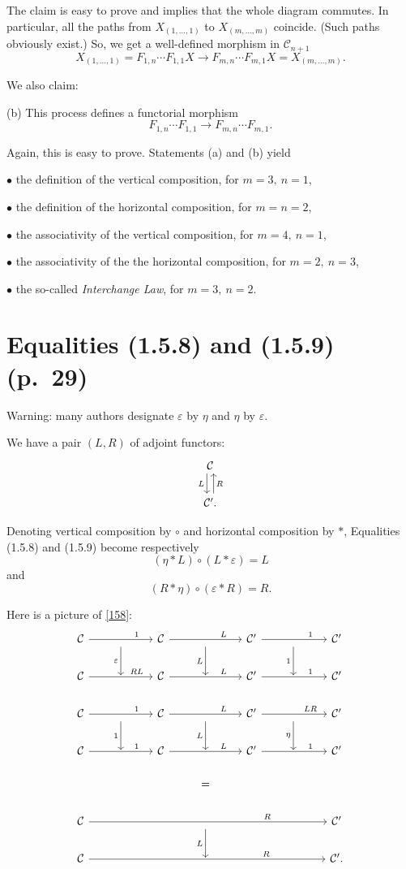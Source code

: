 \documentclass[12pt]{article}
\theoremstyle{remark}%
\newcommand{\bu}{\bullet}
\newcommand{\n}{\noindent}
\newcommand{\C}{\mathcal C}
\newcommand{\e}{\varepsilon}
\newcommand{\be}{\begin{equation}}
\newcommand{\ee}{\end{equation}}
\begin{document}
The claim is easy to prove and implies that the whole diagram commutes. In particular, all the paths from $X_{(1,\dots,1)}$ to $X_{(m,\dots,m)}$ coincide. (Such paths obviously exist.) So, we get a well-defined morphism in $\C_{n+1}$
$$
X_{(1,\dots,1)}=F_{1,n}\cdots F_{1,1}X\to F_{m,n}\cdots F_{m,1}X=X_{(m,\dots,m)}.
$$

We also claim: 

\n(b) This process defines a functorial morphism 
$$
F_{1,n}\cdots F_{1,1}\to F_{m,n}\cdots F_{m,1}.
$$

Again, this is easy to prove. Statements (a) and (b) yield 

\n$\bu$ the definition of the vertical composition, for $m=3,\ n=1$,

\n$\bu$ the definition of the horizontal composition, for $m=n=2$,

\n$\bu$ the associativity of the vertical composition, for $m=4,\ n=1$,

\n$\bu$ the associativity of the the horizontal composition, for $m=2,\ n=3$,

\n$\bu$ the so-called \emph{Interchange Law}, for $m=3,\ n=2$.
%
\section{Equalities (1.5.8) and (1.5.9) (p.~29)}%
%
Warning: many authors designate $\e$ by $\eta$ and $\eta$ by $\e$. 

We have a pair $(L,R)$ of adjoint functors: 
$$
\begin{tikzcd}
\C\ar[xshift=-.7ex]{d}[swap]{L}\\ 
\C'.\ar[xshift=.7ex]{u}[swap]{R}
\end{tikzcd}
$$

Denoting vertical composition by $\circ$ and horizontal composition by $*$, Equalities (1.5.8) and (1.5.9) become respectively 
%
\be\label{158} 
(\eta*L)\circ(L*\e)=L
\ee 
% 
and 
%
\be\label{159} 
(R*\eta)\circ(\e*R)=R.
\ee 
% 

Here is a picture of \eqref{158}: 
$$
\begin{tikzcd}
%
\C\ar{rr}{}[near end]{1}&\ar{d}[swap]{\e}&\C\ar{rr}{}[near end]{L}&\ar{d}[swap]{L}&\C'\ar{rr}{}[near end]{1}&\ar{d}[swap]{1}&\C'\\ 
%
\C\ar{rr}{}[near end]{RL}&{}&\C\ar{rr}{}[near end]{L}&{}&\C'\ar{rr}{}[near end]{1}&{}&\C'\\ 
%
\C\ar{rr}{}[near end]{1}&\ar{d}[swap]{1}&\C\ar{rr}{}[near end]{L}&\ar{d}[swap]{L}&\C'\ar{rr}{}[near end]{LR}&\ar{d}[swap]{\eta}&\C'\\ 
%
\C\ar{rr}{}[near end]{1}&{}&\C\ar{rr}{}[near end]{L}&{}&\C'\ar{rr}{}[near end]{1}&{}&\C'\\ 
%
&&&=\\ 
%
\C\ar{rrrrrr}[near end]{R}&&&{}\ar{d}[swap]{L}&&&\C'\\
%
\C\ar{rrrrrr}[near end]{R}&&&{}&&&\C'.
%
\end{tikzcd}
$$ 
\end{document}
